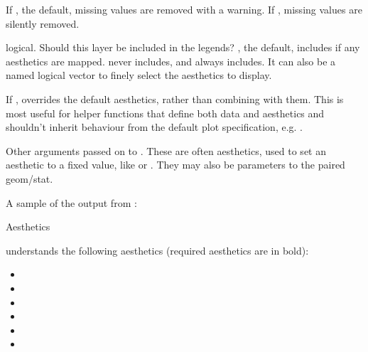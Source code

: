 \documentclass[a4paper]{book}
\begin{document}
\begin{Arguments}
\begin{ldescription}
\item[\code{na.rm}] If , the default, missing values are removed with
a warning. If , missing values are silently removed.

\item[\code{show.legend}] logical. Should this layer be included in the legends?
, the default, includes if any aesthetics are mapped.
 never includes, and  always includes.
It can also be a named logical vector to finely select the aesthetics to
display.

\item[\code{inherit.aes}] If , overrides the default aesthetics,
rather than combining with them. This is most useful for helper functions
that define both data and aesthetics and shouldn't inherit behaviour from
the default plot specification, e.g. .

\item[\code{...}] Other arguments passed on to . These are
often aesthetics, used to set an aesthetic to a fixed value, like
 or . They may also be parameters
to the paired geom/stat.
\end{ldescription}
\end{Arguments}
%
\begin{Details}



A sample of the output from :


\end{Details}
%
\begin{Section}{Aesthetics}

 understands the following aesthetics (required aesthetics
are in bold):
\begin{itemize}

\item{} 
\item{} 
\item{} 
\item{} 
\item{} 
\item{} 

\end{itemize}

\end{Section}
\end{document}
